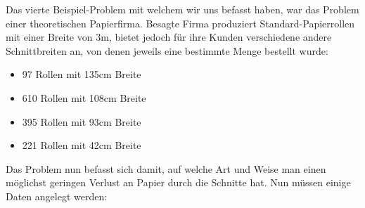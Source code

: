 Das vierte Beispiel-Problem mit welchem wir uns befasst haben, war das Problem einer theoretischen Papierfirma. Besagte Firma produziert Standard-Papierrollen mit einer Breite von 3m, bietet jedoch für ihre Kunden verschiedene andere Schnittbreiten an, von denen jeweils eine bestimmte Menge bestellt wurde:
\begin{itemize}
\item 97 Rollen mit 135cm Breite
\item 610  Rollen mit 108cm Breite
\item 395  Rollen mit 93cm Breite
\item 221  Rollen mit 42cm Breite
\end{itemize}

Das Problem nun befasst sich damit, auf welche Art und Weise man einen möglichst geringen Verlust an Papier durch die Schnitte hat.
Nun müssen einige Daten angelegt werden:

